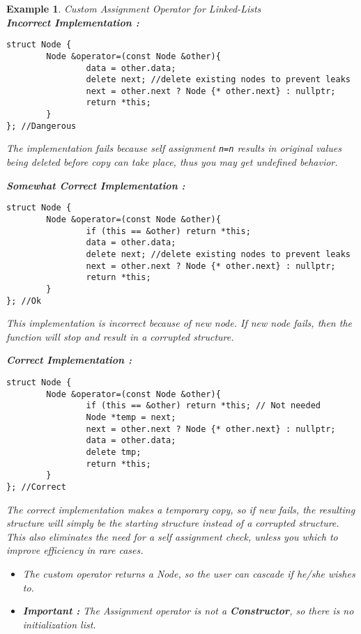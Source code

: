 \documentclass{article}
\newtheorem{ex}[theorem]{Example}
\begin{document}
\begin{ex} Custom Assignment Operator for Linked-Lists \\
\textbf{Incorrect Implementation :}
\begin{lstlisting}
struct Node {
		Node &operator=(const Node &other){
				data = other.data;
				delete next; //delete existing nodes to prevent leaks
				next = other.next ? Node {* other.next} : nullptr;
				return *this;
		}
}; //Dangerous 
\end{lstlisting} 

The implementation fails because self assignment \verb|n=n| results in original values being deleted before copy can take place, thus you may get undefined behavior. 

\textbf{Somewhat Correct Implementation :}

\begin{lstlisting}
struct Node {
		Node &operator=(const Node &other){
				if (this == &other) return *this;
				data = other.data;
				delete next; //delete existing nodes to prevent leaks
				next = other.next ? Node {* other.next} : nullptr;
				return *this;
		}
}; //Ok
\end{lstlisting} 

This implementation is incorrect because of new node. If new node fails, then the function will stop and result in a corrupted structure. 

\textbf{Correct Implementation :}
\begin{lstlisting}
struct Node {
		Node &operator=(const Node &other){
				if (this == &other) return *this; // Not needed 
				Node *temp = next;
				next = other.next ? Node {* other.next} : nullptr;
				data = other.data;
				delete tmp;
				return *this;
		}
}; //Correct
\end{lstlisting} 

The correct implementation makes a temporary copy, so if new fails, the resulting structure will simply be the starting structure instead of a corrupted structure. This also eliminates the need for a self assignment check, unless you which to improve efficiency in rare cases.
\begin{itemize}
\item The custom operator returns a Node, so the user can cascade if he/she wishes to. 
\item \textbf{Important : } The Assignment operator is not a \textbf{Constructor}, so there is no initialization list.
\end{itemize}
\end{ex}
\end{document}
